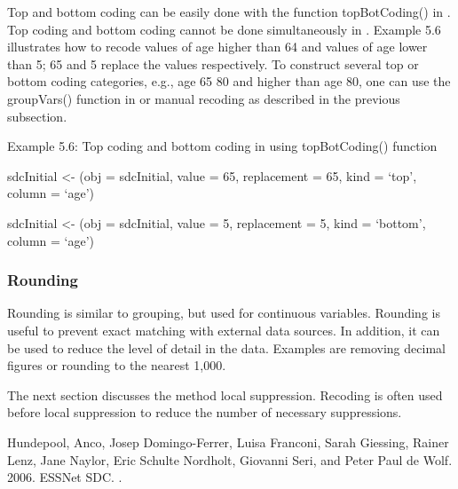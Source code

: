 \documentclass[letterpaper,10pt,english]{sphinxmanual}
\begin{document}
Top and bottom coding can be easily done with the function
topBotCoding() in . Top coding and bottom coding cannot be
done simultaneously in . Example 5.6 illustrates how to recode
values of age higher than 64 and values of age lower than 5; 65 and 5
replace the values respectively. To construct several top or bottom
coding categories, e.g., age 65 \textendash{} 80 and higher than age 80, one can use
the groupVars() function in  or manual recoding as described
in the previous subsection.

Example 5.6: Top coding and bottom coding in  using
topBotCoding() function

\begin{DUlineblock}{0em}
\item[] 
\item[] sdcInitial \textless{}- (obj = sdcInitial, value = 65,
replacement = 65, kind = ‘top’, column = ‘age’)
\item[] 
\item[] sdcInitial \textless{}- (obj = sdcInitial, value = 5,
replacement = 5, kind = ‘bottom’, column = ‘age’)
\end{DUlineblock}


\subsubsection{Rounding}
\label{\detokenize{anon_methods:rounding}}
Rounding is similar to grouping, but used for continuous variables.
Rounding is useful to prevent exact matching with external data sources.
In addition, it can be used to reduce the level of detail in the data.
Examples are removing decimal figures or rounding to the nearest 1,000.

The next section discusses the method local suppression. Recoding is
often used before local suppression to reduce the number of necessary
suppressions.


Hundepool, Anco, Josep Domingo-Ferrer, Luisa Franconi, Sarah Giessing,
Rainer Lenz, Jane Naylor, Eric Schulte Nordholt, Giovanni Seri, and
Peter Paul de Wolf. 2006. 
ESSNet SDC. .
\end{document}
